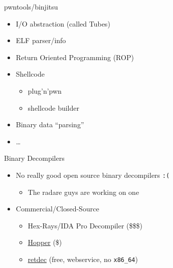 \begin{frame}
  {pwntools/binjitsu}

  \begin{itemize}
    \item I/O abstraction (called Tubes)
    \item ELF parser/info
    \item Return Oriented Programming (ROP)
    \item Shellcode
      \begin{itemize}
        \item plug'n'pwn
        \item shellcode builder
      \end{itemize}
    \item Binary data ``parsing''
    \item \ldots
  \end{itemize}
\end{frame}


\begin{frame}
  {Binary Decompilers}

  \begin{itemize}
    \item No really good open source binary decompilers \verb+:(+
      \begin{itemize}
        \item The radare guys are working on one
      \end{itemize}
    \item Commercial/Closed-Source
      \begin{itemize}
        \item Hex-Rays/IDA Pro Decompiler (\$\$\$)
        \item \href{http://hopperapp.com/}{Hopper} (\$)
        \item \href{https://retdec.com/}{retdec} (free, webservice, no \verb+x86_64+)
      \end{itemize}
  \end{itemize}
\end{frame}

